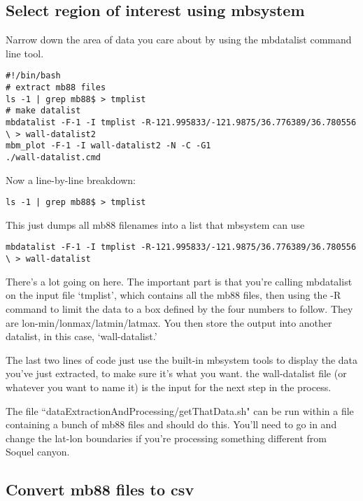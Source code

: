 \documentclass[12pt]{amsart}
\begin{document}
\subsection{Select region of interest using mbsystem}

Narrow down the area of data you care about by using the mbdatalist command line tool. 
\vspace{12pt}
\begin{tiny}
\begin{lstlisting}
#!/bin/bash 
# extract mb88 files
ls -1 | grep mb88$ > tmplist
# make datalist
mbdatalist -F-1 -I tmplist -R-121.995833/-121.9875/36.776389/36.780556 \ > wall-datalist2
mbm_plot -F-1 -I wall-datalist2 -N -C -G1 
./wall-datalist.cmd 
\end{lstlisting}
\end{tiny}
\vspace{12pt}
Now a line-by-line breakdown:
\begin{lstlisting}
ls -1 | grep mb88$ > tmplist
\end{lstlisting}
This just dumps all mb88 filenames into a list that mbsystem can use
\vspace{12pt}
\begin{tiny}
\begin{lstlisting}
mbdatalist -F-1 -I tmplist -R-121.995833/-121.9875/36.776389/36.780556 \ > wall-datalist
\end{lstlisting}
\end{tiny}
\normalsize
There's a lot going on here. The important part is that you're calling mbdatalist on the input file `tmplist', which contains all the mb88 files, then using the -R command to limit the data to a box defined by the four numbers to follow. They are lon-min/lonmax/latmin/latmax. You then store the output into another datalist, in this case, `wall-datalist.'

The last two lines of code just use the built-in mbsystem tools to display the data you've just extracted, to make sure it's what you want. the wall-datalist file (or whatever you want to name it) is the input for the next step in the process.

The file ``dataExtractionAndProcessing/getThatData.sh" can be run within a file containing a bunch of mb88 files and should do this. You'll need to go in and change the lat-lon boundaries if you're processing something different from Soquel canyon.


\subsection{Convert mb88 files to csv}
\end{document}
